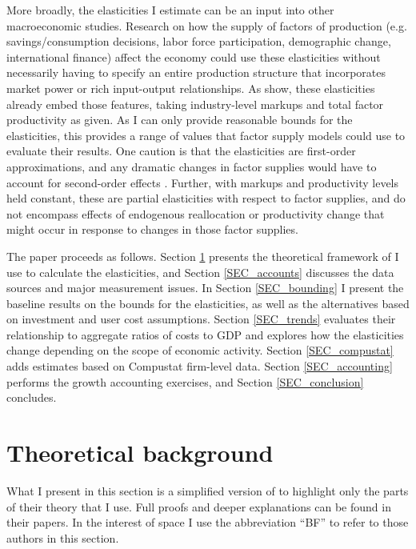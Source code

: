 \documentclass[11pt]{article}
\begin{document}
More broadly, the elasticities I estimate can be an input into other macroeconomic studies. Research on how the supply of factors of production (e.g. savings/consumption decisions, labor force participation, demographic change, international finance) affect the economy could use these elasticities without necessarily having to specify an entire production structure that incorporates market power or rich input-output relationships. As \cite{bfshortnote,bfprodge} show, these elasticities already embed those features, taking industry-level markups and total factor productivity as given. As I can only provide reasonable bounds for the elasticities, this provides a range of values that factor supply models could use to evaluate their results. One caution is that the elasticities are first-order approximations, and any dramatic changes in factor supplies would have to account for second-order effects \citep{bfmicro}. Further, with markups and productivity levels held constant, these are partial elasticities with respect to factor supplies, and do not encompass effects of endogenous reallocation or productivity change that might occur in response to changes in those factor supplies. 

The paper proceeds as follows. Section \ref{SEC_theory} presents the theoretical framework of \cite{bfshortnote,bfprodge} I use to calculate the elasticities, and Section \ref{SEC_accounts} discusses the data sources and major measurement issues. In Section \ref{SEC_bounding} I present the baseline results on the bounds for the elasticities, as well as the alternatives based on investment and user cost assumptions. Section \ref{SEC_trends} evaluates their relationship to aggregate ratios of costs to GDP and explores how the elasticities change depending on the scope of economic activity. Section \ref{SEC_compustat} adds estimates based on Compustat firm-level data. Section \ref{SEC_accounting} performs the growth accounting exercises, and Section \ref{SEC_conclusion} concludes.

\section{Theoretical background}\label{SEC_theory}
What I present in this section is a simplified version of \cite{bfshortnote,bfprodge} to highlight only the parts of their theory that I use. Full proofs and deeper explanations can be found in their papers. In the interest of space I use the abbreviation ``BF'' to refer to those authors in this section.
\end{document}
